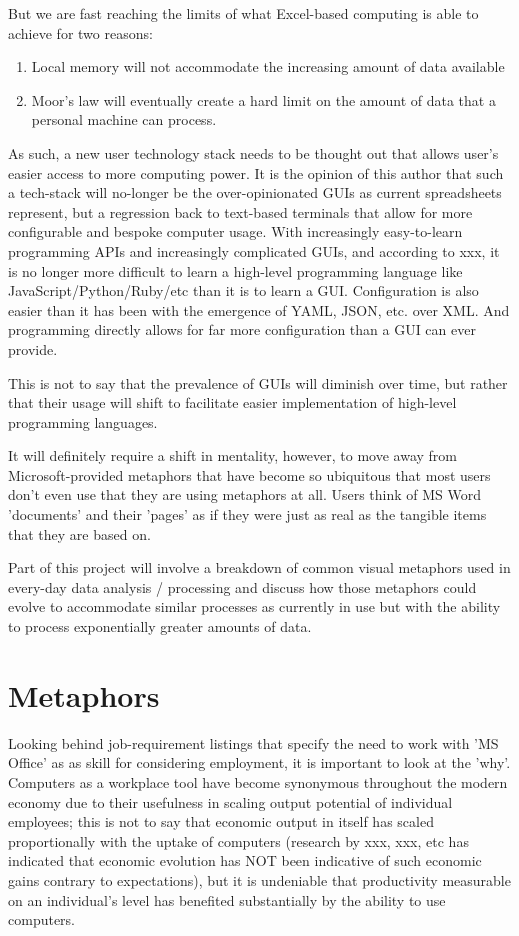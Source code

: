 But we are fast reaching the limits of what Excel-based computing is able to achieve for two reasons:

\begin{enumerate}
    \item Local memory will not accommodate the increasing amount of data available
    \item Moor's law will eventually create a hard limit on the amount of data that a personal machine can process.
\end{enumerate}

As such, a new user technology stack needs to be thought out that allows user's easier access to more computing power. It is the opinion of this author that such a tech-stack will no-longer be the over-opinionated GUIs as current spreadsheets represent, but a regression back to text-based terminals that allow for more configurable and bespoke computer usage. With increasingly easy-to-learn programming APIs and increasingly complicated GUIs, and according to xxx, it is no longer more difficult to learn a high-level programming language like JavaScript/Python/Ruby/etc than it is to learn a GUI. Configuration is also easier than it has been with the emergence of YAML, JSON, etc. over XML. And programming directly allows for far more configuration than a GUI can ever provide.

This is not to say that the prevalence of GUIs will diminish over time, but rather that their usage will shift to facilitate easier implementation of high-level programming languages.

It will definitely require a shift in mentality, however, to move away from Microsoft-provided metaphors that have become so ubiquitous that most users don't even use that they are using metaphors at all. Users think of MS Word 'documents' and their 'pages' as if they were just as real as the tangible items that they are based on.

Part of this project will involve a breakdown of common visual metaphors used in every-day data analysis / processing and discuss how those metaphors could evolve to accommodate similar processes as currently in use but with the ability to process exponentially greater amounts of data.

\section{Metaphors}
Looking behind job-requirement listings that specify the need to work with 'MS Office' as as skill for considering employment, it is important to look at the 'why'. Computers as a workplace tool have become synonymous throughout the modern economy due to their usefulness in scaling output potential of individual employees; this is not to say that economic output in itself has scaled proportionally with the uptake of computers (research by xxx, xxx, etc has indicated that economic evolution has NOT been indicative of such economic gains contrary to expectations), but it is undeniable that productivity measurable on an individual's level has benefited substantially by the ability to use computers.

